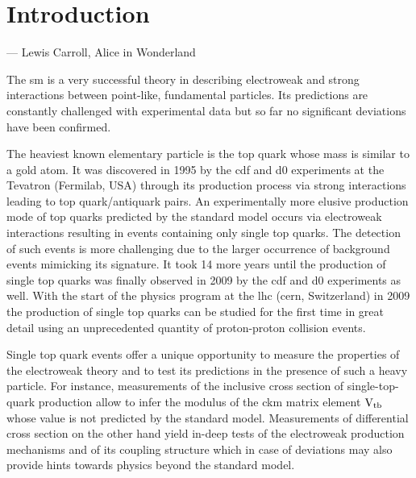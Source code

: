 \chapter*{Introduction}


\hspace{0.025\textwidth}\parbox[t][][t]{0.94\textwidth}{
\small{}\hfill --- Lewis Carroll, Alice in Wonderland\\[0.6\baselineskip]
}

The \acrlong{sm} is a very successful theory in describing electroweak and strong interactions between point-like, fundamental particles. Its predictions are constantly challenged with experimental data but so far no significant deviations have been confirmed. 

The heaviest known elementary particle is the top quark whose mass is similar to a gold atom. It was discovered in 1995 by the \gls{cdf} and \gls{d0} experiments at the Tevatron (Fermilab, USA) through its production process via strong interactions leading to top quark/antiquark pairs. An experimentally more elusive production mode of top quarks predicted by the standard model occurs via electroweak interactions resulting in events containing only single top quarks. The detection of such events is more challenging due to the larger occurrence of background events mimicking its signature. It took 14 more years until the production of single top quarks was finally observed in 2009 by the \gls{cdf} and \gls{d0} experiments as well. With the start of the physics program at the \gls{lhc} (\gls{cern}, Switzerland) in 2009 the production of single top quarks can be studied for the first time in great detail using an unprecedented quantity of proton-proton collision events.

Single top quark events offer a unique opportunity to measure the properties of the electroweak theory and to test its predictions in the presence of such a heavy particle. For instance, measurements of the inclusive cross section of single-top-quark production allow to infer the modulus of the \gls{ckm} matrix element ${\textrm{V}_\textrm{tb}}$ whose value is not predicted by the standard model. Measurements of differential cross section on the other hand yield in-deep tests of the electroweak production mechanisms and of its coupling structure which in case of deviations may also provide hints towards physics beyond the standard model.

